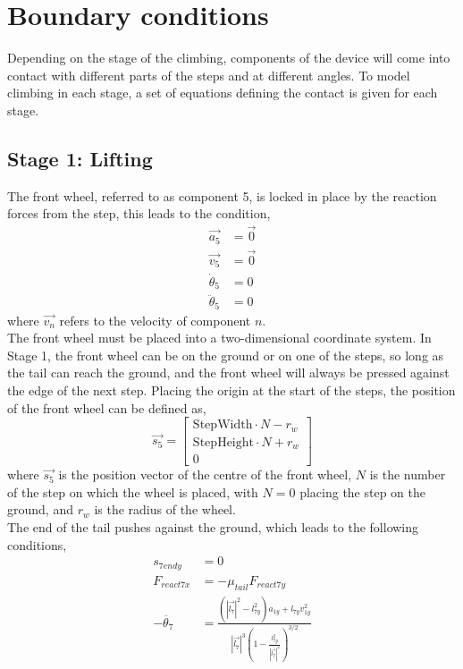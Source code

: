 \section{Boundary conditions}
Depending on the stage of the climbing, components of the device will come into contact with different parts of the steps and at different angles. To model climbing in each stage, a set of equations defining the contact is given for each stage.\\
\subsection*{Stage 1: Lifting}
The front wheel, referred to as component 5, is locked in place by the reaction forces from the step, this leads to the condition,
\begin{subequations}
	\label{wheel1locked}
	\begin{align}
		\vec{a_5} &= \vec{0}\\
		\vec{v_5} &= \vec{0}\\
		\dot{\theta}_5 &= 0\\
		\ddot{\theta}_5 &= 0
	\end{align}
\end{subequations}
where $\vec{v_n}$ refers to the velocity of component $n$. \\
The front wheel must be placed into a two-dimensional coordinate system. In Stage 1, the front wheel can be on the ground or on one of the steps, so long as the tail can reach the ground, and the front wheel will always be pressed against the edge of the next step. Placing the origin at the start of the steps, the position of the front wheel can be defined as,
\begin{equation}
	\vec{s_5}
	=
	\begin{bmatrix}
		\mathrm{StepWidth}\cdot N-r_w\\
		\mathrm{StepHeight}\cdot N+r_w\\
		0
	\end{bmatrix}
\end{equation}
where $\vec{s_5}$ is the position vector of the centre of the front wheel, $N$ is the number of the step on which the wheel is placed, with $N = 0$ placing the step on the ground, and $r_w$ is the radius of the wheel.\\
The end of the tail pushes against the ground, which leads to the following conditions,
\begin{subequations}
	\label{tailonground}
	\begin{align}
		s_{7endy} &= 0\\
		F_{react7x} &=  -\mu_{tail}F_{react7y}\\
		-\ddot{\theta_7} &= \frac{(|\vec{l_7}|^2 - l_{7y}^2)a_{1y} + l_{7y}v_{1y}^2}{|\vec{l_7}|^3 (1 - \frac{l_{7y}^2}{|\vec{l_7}|^2})^{3/2}} \label{tailongroundkinematics}
	\end{align}
\end{subequations}
